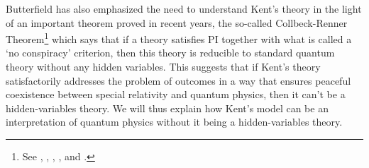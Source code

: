Butterfield has also emphasized the need to understand Kent's theory in the light of an important theorem proved in recent years, the so-called Collbeck-Renner Theorem\footnote{See \cite{LeegwaterGijs2016Aitf}, \cite{ColbeckRoger2011Neoq}, \cite{ColbeckRoger2012Tcoq}, \cite{LandsmanK2015OtCt}, and \cite{Landsman}.} which says that if a theory satisfies PI together with what is called a `no conspiracy' criterion, then this theory is reducible to standard quantum theory without any hidden variables. This suggests that if Kent's theory satisfactorily addresses the problem of outcomes in a way that  ensures peaceful coexistence between special relativity and quantum physics, then it can't be a hidden-variables theory. We will thus explain how Kent's model can be an interpretation of quantum physics without it being a hidden-variables theory.
